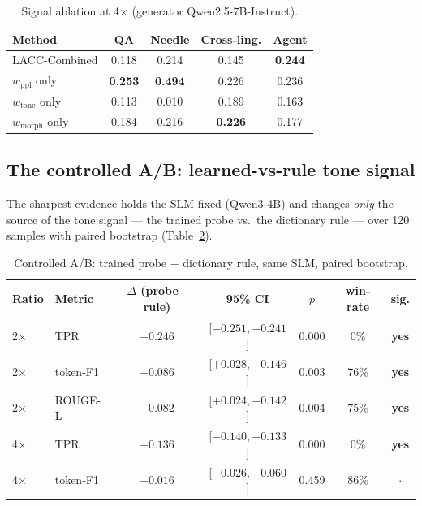 \documentclass[runningheads]{llncs}
\begin{document}
\begin{table}[H]
\centering
\caption{Signal ablation at 4$\times$ (generator Qwen2.5-7B-Instruct).}
\label{tab:ablation}
\begin{tabular}{lcccc}
\toprule
\textbf{Method} & \textbf{QA} & \textbf{Needle} & \textbf{Cross-ling.} & \textbf{Agent} \\
\midrule
LACC-Combined & 0.118 & 0.214 & 0.145 & \textbf{0.244} \\
$w_{\text{ppl}}$ only & \textbf{0.253} & \textbf{0.494} & 0.226 & 0.236 \\
$w_{\text{tone}}$ only & 0.113 & 0.010 & 0.189 & 0.163 \\
$w_{\text{morph}}$ only & 0.184 & 0.216 & \textbf{0.226} & 0.177 \\
\bottomrule
\end{tabular}
\end{table}

\subsection{The controlled A/B: learned-vs-rule tone signal}

The sharpest evidence holds the SLM fixed (Qwen3-4B) and changes \emph{only} the source of the tone signal --- the trained probe vs.\ the dictionary rule --- over 120 samples with paired bootstrap (Table~\ref{tab:ab}).

\begin{table}[H]
\centering
\caption{Controlled A/B: trained probe $-$ dictionary rule, same SLM, paired bootstrap.}
\label{tab:ab}
\begin{tabular}{llccccc}
\toprule
\textbf{Ratio} & \textbf{Metric} & \textbf{$\Delta$ (probe$-$rule)} & \textbf{95\% CI} & \textbf{$p$} & \textbf{win-rate} & \textbf{sig.} \\
\midrule
2$\times$ & TPR      & $-0.246$ & [$-0.251,-0.241$] & 0.000 & 0\% & \textbf{yes} \\
2$\times$ & token-F1 & $+0.086$ & [$+0.028,+0.146$] & 0.003 & 76\% & \textbf{yes} \\
2$\times$ & ROUGE-L  & $+0.082$ & [$+0.024,+0.142$] & 0.004 & 75\% & \textbf{yes} \\
4$\times$ & TPR      & $-0.136$ & [$-0.140,-0.133$] & 0.000 & 0\% & \textbf{yes} \\
4$\times$ & token-F1 & $+0.016$ & [$-0.026,+0.060$] & 0.459 & 86\% & $\cdot$ \\
\bottomrule
\end{tabular}
\end{table}
\end{document}
